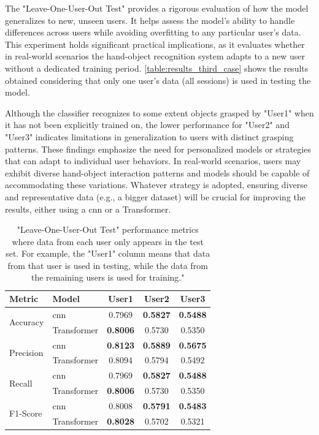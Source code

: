 The "Leave-One-User-Out Test" provides a rigorous evaluation of how the model generalizes to new, unseen users. It helps assess the model’s ability to handle differences across users while avoiding overfitting to any particular user’s data. This experiment holds significant practical implications, as it evaluates whether in real-world scenarios the hand-object recognition system adapts to a new user without a dedicated training period. \autoref{table:results_third_case} shows the results obtained considering that only one user's data (all sessions) is used in testing the model. 

Although the classifier recognizes to some extent objects grasped by "User1" when it has not been explicitly trained on, the lower performance for "User2" and "User3" indicates limitations in generalization to users with distinct grasping patterns. These findings emphasize the need for personalized models or strategies that can adapt to individual user behaviors. In real-world scenarios, users may exhibit diverse hand-object interaction patterns and models should be capable of accommodating these variations. Whatever strategy is adopted, ensuring diverse and representative data (e.g., a bigger dataset) will be crucial for improving the results, either using a \acs{cnn} or a Transformer. 

\begin{table}[ht]
    \centering
    \caption{"Leave-One-User-Out Test" performance metrics where data from each user only appears in the test set. For example, the "User1" column means that data from that user is used in testing, while the data from the remaining users is used for training."}
    \label{table:results_third_case}
    \begin{tabular}{l|lccc}
        \toprule
        Metric & Model & User1 & User2 & User3 \\
        \midrule
        \multirow{2}{*}{Accuracy} & \acs{cnn} & 0.7969 & \textbf{0.5827} & \textbf{0.5488} \\
        & Transformer & \textbf{0.8006} & 0.5730 & 0.5350 \\
        \midrule
        \multirow{2}{*}{Precision} & \acs{cnn} & \textbf{0.8123} & \textbf{0.5889} & \textbf{0.5675} \\
        & Transformer & 0.8094 & 0.5794 & 0.5492 \\
        \midrule
        \multirow{2}{*}{Recall} & \acs{cnn} & 0.7969 & \textbf{0.5827} & \textbf{0.5488} \\
        & Transformer & \textbf{0.8006} & 0.5730 & 0.5350 \\
        \midrule
        \multirow{2}{*}{F1-Score} & \acs{cnn} & 0.8008 & \textbf{0.5791} & \textbf{0.5483} \\
        & Transformer & \textbf{0.8028} & 0.5702 & 0.5321 \\
        \bottomrule
    \end{tabular}
\end{table}

